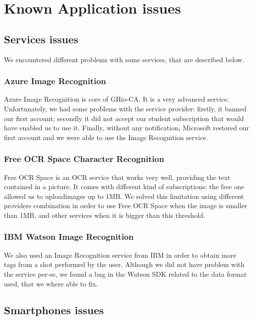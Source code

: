 \section{Known Application issues}
\label{sec:issues}

\subsection{Services issues}

We encountered different problems with some services, that are described below.

\subsubsection{Azure Image Recognition}

Azure Image Recognition is core of GHio-CA. It is a very advanced service. Unfortunately, we had some problems with the service provider: firstly, it banned our first account; secondly it did not accept our student subscription that would have enabled us to use it. Finally, without any notification, Microsoft restored our first account and we were able to use the Image Recognition service.

\subsubsection{Free OCR Space Character Recognition}

Free OCR Space is an OCR service that works very well, providing the text contained in a picture. It comes with different kind of subscriptions: the free one allowed us to uploadimages up to 1MB. We solved this limitation using different providers combination in order to use Free OCR Space when the image is smaller than 1MB, and other services when it is bigger than this threshold.

\subsubsection{IBM Watson Image Recognition}

We also used an Image Recognition service from IBM in order to obtain more tags from a shot performed by the user. Although we did not have problem with the service per-se, we found a bug in the Watson SDK related to the data format used, that we where able to fix.

\subsection{Smartphones issues}

